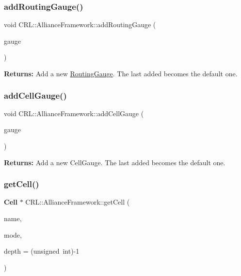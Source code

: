 \subsubsection{\texorpdfstring{add\+Routing\+Gauge()}{addRoutingGauge()}}
{\footnotesize\ttfamily void C\+R\+L\+::\+Alliance\+Framework\+::add\+Routing\+Gauge (\begin{DoxyParamCaption}\item[{\mbox{\hyperlink{classCRL_1_1RoutingGauge}{Routing\+Gauge}} $\ast$}]{gauge }\end{DoxyParamCaption})}

{\bfseries Returns\+:} Add a new \mbox{\hyperlink{classCRL_1_1RoutingGauge}{Routing\+Gauge}}. The last added becomes the default one. \mbox{\label{classCRL_1_1AllianceFramework_aab16db33a0ce2e3bce5739f7cadb3d5a}} 
\subsubsection{\texorpdfstring{add\+Cell\+Gauge()}{addCellGauge()}}
{\footnotesize\ttfamily void C\+R\+L\+::\+Alliance\+Framework\+::add\+Cell\+Gauge (\begin{DoxyParamCaption}\item[{Cell\+Gauge $\ast$}]{gauge }\end{DoxyParamCaption})}

{\bfseries Returns\+:} Add a new Cell\+Gauge. The last added becomes the default one. \mbox{\label{classCRL_1_1AllianceFramework_a329d04c188668968308108523d16e2be}} 
\subsubsection{\texorpdfstring{get\+Cell()}{getCell()}}
{\footnotesize\ttfamily \textbf{ Cell} $\ast$ C\+R\+L\+::\+Alliance\+Framework\+::get\+Cell (\begin{DoxyParamCaption}\item[{const string \&}]{name,  }\item[{unsigned int}]{mode,  }\item[{unsigned int}]{depth = {\ttfamily (unsigned~int)-\/1} }\end{DoxyParamCaption})}


